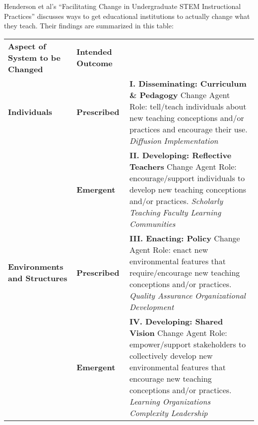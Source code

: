 

Henderson et al's
``Facilitating Change in Undergraduate STEM Instructional Practices''
\cite{bib:henderson-facilitating}
discusses ways to get educational institutions to actually change what
they teach.  Their findings are summarized in this table:

\begin{tabular}{lll}

\textbf{Aspect of System to be Changed}
&
\textbf{Intended Outcome}
&
\\

\textbf{Individuals}
&
\textbf{Prescribed}
&
  \textbf{I. Disseminating: Curriculum \& Pedagogy}
  \newline
  Change Agent Role: tell/teach individuals about new teaching conceptions and/or practices and encourage their use.
  \newline
  \emph{Diffusion}
  \newline
  \emph{Implementation}
\\

&
\textbf{Emergent}
&
  \textbf{II. Developing: Reflective Teachers}
  \newline
  Change Agent Role: encourage/support individuals to develop new teaching conceptions and/or practices.
  \newline
  \emph{Scholarly Teaching}
  \newline
  \emph{Faculty Learning Communities}
\\

\textbf{Environments and Structures}
&
\textbf{Prescribed}
&
  \textbf{III. Enacting: Policy}
  \newline
  Change Agent Role: enact new environmental features that require/encourage new teaching conceptions and/or practices.
  \newline
  \emph{Quality Assurance}
  \newline
  \emph{Organizational Development}
\\

&
\textbf{Emergent}
&
  \textbf{IV. Developing: Shared Vision}
  \newline
  Change Agent Role: empower/support stakeholders to collectively develop new environmental features that encourage new teaching conceptions and/or practices.
  \newline
  \emph{Learning Organizations}
  \newline
  \emph{Complexity Leadership}
\\
\end{tabular}


